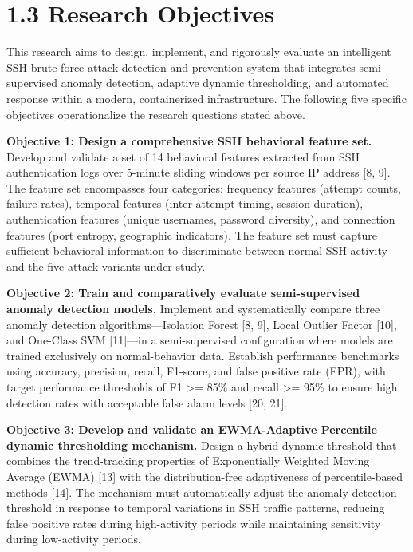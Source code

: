 \documentclass[
  a4paper]{report}
\begin{document}
\section{1.3 Research Objectives}\label{research-objectives}

This research aims to design, implement, and rigorously evaluate an
intelligent SSH brute-force attack detection and prevention system that
integrates semi-supervised anomaly detection, adaptive dynamic
thresholding, and automated response within a modern, containerized
infrastructure. The following five specific objectives operationalize
the research questions stated above.

\textbf{Objective 1: Design a comprehensive SSH behavioral feature set.}
Develop and validate a set of 14 behavioral features extracted from SSH
authentication logs over 5-minute sliding windows per source IP address
{[}8, 9{]}. The feature set encompasses four categories: frequency
features (attempt counts, failure rates), temporal features
(inter-attempt timing, session duration), authentication features
(unique usernames, password diversity), and connection features (port
entropy, geographic indicators). The feature set must capture sufficient
behavioral information to discriminate between normal SSH activity and
the five attack variants under study.

\textbf{Objective 2: Train and comparatively evaluate semi-supervised
anomaly detection models.} Implement and systematically compare three
anomaly detection algorithms---Isolation Forest {[}8, 9{]}, Local
Outlier Factor {[}10{]}, and One-Class SVM {[}11{]}---in a
semi-supervised configuration where models are trained exclusively on
normal-behavior data. Establish performance benchmarks using accuracy,
precision, recall, F1-score, and false positive rate (FPR), with target
performance thresholds of F1 \textgreater= 85\% and recall \textgreater=
95\% to ensure high detection rates with acceptable false alarm levels
{[}20, 21{]}.

\textbf{Objective 3: Develop and validate an EWMA-Adaptive Percentile
dynamic thresholding mechanism.} Design a hybrid dynamic threshold that
combines the trend-tracking properties of Exponentially Weighted Moving
Average (EWMA) {[}13{]} with the distribution-free adaptiveness of
percentile-based methods {[}14{]}. The mechanism must automatically
adjust the anomaly detection threshold in response to temporal
variations in SSH traffic patterns, reducing false positive rates during
high-activity periods while maintaining sensitivity during low-activity
periods.
\end{document}
